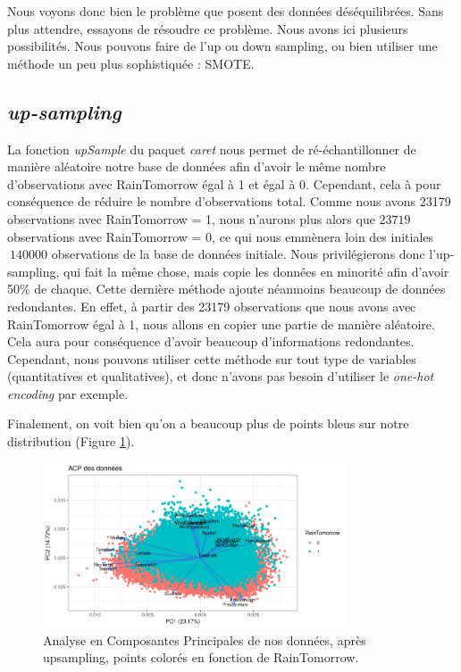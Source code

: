 \documentclass{article}
\begin{document}
Nous voyons donc bien le problème que posent des données déséquilibrées. Sans plus attendre, essayons de résoudre ce problème. Nous avons ici plusieurs possibilités. Nous pouvons faire de l'up ou down sampling, ou bien utiliser une méthode un peu plus sophistiquée : SMOTE.

\subsection{\emph{up-sampling}}

La fonction \emph{upSample} du paquet \emph{caret} nous permet de ré-échantillonner de manière aléatoire notre base de données afin d'avoir le même nombre d'observations avec RainTomorrow égal à 1 et égal à 0. Cependant, cela à pour conséquence de réduire le nombre d'observations total. Comme nous avons 23179 observations avec RainTomorrow = 1, nous n'aurons plus alors que $23719$ observations avec RainTomorrow = 0, ce qui nous emmènera loin des initiales $~140000$ observations de la base de données initiale. Nous privilégierons donc l'up-sampling, qui fait la même chose, mais copie les données en minorité afin d'avoir 50\% de chaque. Cette dernière méthode ajoute néanmoins beaucoup de données redondantes. En effet, à partir des 23179 observations que nous avons avec RainTomorrow égal à 1, nous allons en copier une partie de manière aléatoire. Cela aura pour conséquence d'avoir beaucoup d'informations redondantes. Cependant, nous pouvons utiliser cette méthode sur tout type de variables (quantitatives et qualitatives), et donc n'avons pas besoin d'utiliser le \emph{one-hot encoding} par exemple. 

Finalement, on voit bien qu'on a beaucoup plus de points bleus sur notre distribution (Figure \ref{fig:pca_raintomorrow_up}).

\begin{figure}[htp]
    \centering
    \includegraphics[width=0.8\textwidth]{Images/pca/pca_up.png}
    \caption{Analyse en Composantes Principales de nos données, après upsampling, points colorés en fonction de RainTomorrow.}
    \label{fig:pca_raintomorrow_up}
\end{figure}
\end{document}
